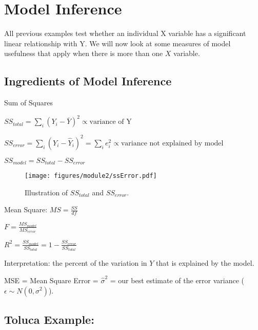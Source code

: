 \documentclass[12pt]{notes}
\begin{document}
\nspace
{}

\begin{minipage}[l][2cm][c]{\textwidth}
\end{minipage}

\section*{Model Inference}
All previous examples test whether an individual X variable has a significant linear relationship with Y. We will now look at some measures of model usefulness that apply when there is more than one $X$ variable. 

\subsection*{Ingredients of Model Inference}
\bi
\item Sum of Squares
\bi
\item $SS_{total} = \sum_i\left(Y_i - \bar{Y}\right)^2 \propto \text{variance of Y}$
\item $SS_{error} = \sum_i\left(Y_i - \hat{Y}_i\right)^2 = \sum_ie_i^2 \propto \text{variance not explained by model}$
\item $SS_{model} = SS_{total} - SS_{error}$
\ei
\ei

\begin{figure}[H]
\texttt{[image: figures/module2/ssError.pdf]}
\caption{Illustration of $SS_{total}$ and $SS_{error}$.}
\end{figure}

\bi
\item Mean Square: $MS = \frac{SS}{df}$ 
\item $F = \frac{MS_{model}}{MS_{error}}$
\item $R^2 = \frac{SS_{model}}{SS_{total}} = 1 - \frac{SS_{error}}{SS_{total}}$
\bi
\item Interpretation: the percent of the variation in $Y$ that is explained by the model. 
\ei
\item MSE = Mean Square Error = $\hat{\sigma}^2$ = our best estimate of the error variance ($\epsilon \sim N(0, \sigma^2)$).
\ei

\subsection*{Toluca Example:}
\end{document}
